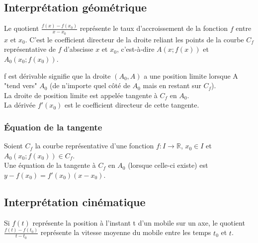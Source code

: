 \documentclass[a4paper,10pt]{book} %
\newcommand{\R}{\mathbb{R}}
\begin{document}
\subsection{Interprétation géométrique}
\begin{figure}
\end{figure}

Le quotient $\frac{f(x)-f(x_{0})}{x-x_{0}}$ représente le taux d'accroissement de la fonction $f$ entre $x$ et $x_{0}$. C'est le coefficient directeur de la droite reliant les points de la courbe $C_{f}$ représentative de $f$ d'abscisse $x$ et $x_{0}$, c'est-à-dire $A(x;f(x))$ et $A_{0}(x_{0};f(x_{0}))$.

\bigskip

f est dérivable signifie que la droite $(A_{0},A)$ a une position limite lorsque A "tend vers" $A_{0}$ (de n'importe quel côté de $A_{0}$ mais en restant sur $C_{f}$).\\

La droite de position limite est appelée tangente à $C_{f}$ en $A_{0}$.\\
La dérivée $f'(x_{0})$ est le coefficient directeur de cette tangente.

\subsubsection{Équation de la tangente}
Soient $C_{f}$ la courbe représentative d'une fonction $f : I\rightarrow \R$, $x_{0}\in I$ et $A_{0}(x_{0};f(x_{0}))\in C_{f}$.\\
Une équation de la tangente à $C_{f}$ en $A_{0}$ (lorsque celle-ci existe) est $y-f(x_{0})=f'(x_{0})(x-x_{0})$.

\subsection{Interprétation cinématique}
Si $f(t)$ représente la position à l'instant t d'un mobile sur un axe, le quotient $\frac{f(t)-f(t_{0})}{t-t_{0}}$ représente la vitesse moyenne du mobile entre les temps $t_{0}$ et $t$.\\
\end{document}
